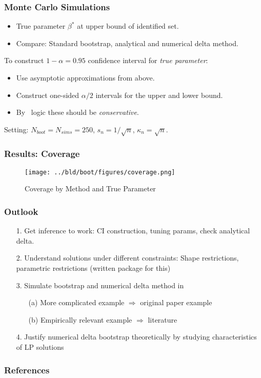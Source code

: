 \documentclass[11pt, aspectratio=169]{beamer}
\begin{document}
\begin{frame}
    \frametitle{Monte Carlo Simulations}

    \begin{itemize}
        \item True parameter $\beta^*$ at upper bound of identified set.
        \item Compare: Standard bootstrap, analytical and numerical delta method.
    \end{itemize}

    \vspace{0.5cm}

    To construct $1-\alpha = 0.95$ confidence interval for \textit{true parameter}:
    \begin{itemize}
        \item Use asymptotic approximations from above.
        \item Construct one-sided $\alpha/2$ intervals for the upper and lower bound.
        \item By~\cite{imbens2004confidence} logic these should be \textit{conservative}.
    \end{itemize}

    \vspace{0.5cm}

    Setting: $N_{boot} = N_{sims} = 250$, $s_n = 1 / \sqrt{n}$, $\kappa_n = \sqrt{n}$.

\end{frame}

\begin{frame}
    \frametitle{Results: Coverage}

    \begin{figure}
		\texttt{[image: ../bld/boot/figures/coverage.png]}
        \caption{Coverage by Method and True Parameter}
    \end{figure}

\end{frame}

\begin{frame}
    \frametitle{Outlook}
    \begin{itemize}
        \item[1.] Get inference to work: CI construction, tuning params, check analytical delta.
        \item[2.] Understand solutions under different constraints: Shape restrictions, parametric restrictions (written package for this)
        \item[3.] Simulate bootstrap and numerical delta method in
        \begin{itemize}
            \item[(a)] More complicated example $\Rightarrow$ original paper example
            \item[(b)] Empirically relevant example $\Rightarrow$ literature
        \end{itemize}
        \item[4.] Justify numerical delta bootstrap theoretically by studying characteristics of LP solutions
    \end{itemize}

\end{frame}

\begin{frame}[allowframebreaks]
    \frametitle{References}
    \renewcommand{\bibfont}{\normalfont\footnotesize}
    \printbibliography
\end{frame}
\end{document}
